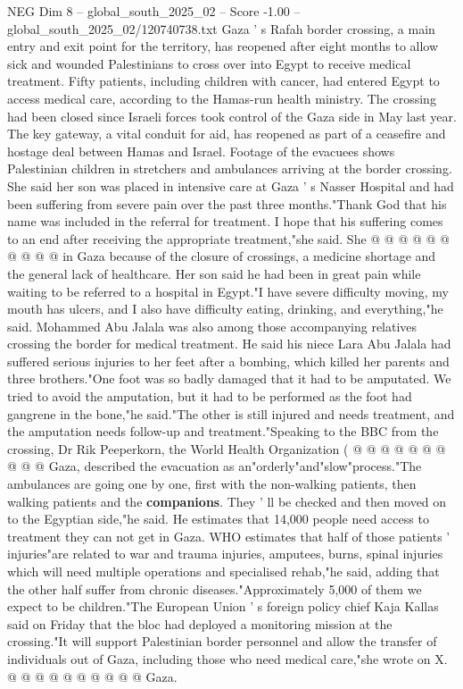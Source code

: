 \begin{textsample}{NEG Dim 8 – global\_south\_2025\_02 – Score -1.00 – global\_south\_2025\_02/120740738.txt}  \label{ex:f8_neg_063}
Gaza ' s Rafah border crossing, a main entry and exit point for the territory, has reopened after eight months to allow sick and wounded Palestinians to cross over into Egypt to receive medical treatment.
Fifty patients, including children with cancer, had entered Egypt to access medical care, according to the Hamas-run health ministry.
The crossing had been closed since Israeli forces took control of the Gaza side in May last year.
The key gateway, a vital conduit for aid, has reopened as part of a ceasefire and hostage deal between Hamas and Israel.
Footage of the evacuees shows Palestinian children in stretchers and ambulances arriving at the border crossing.
She said her son was placed in intensive care at Gaza ' s Nasser Hospital and had been suffering from severe pain over the past three months."Thank God that his name was included in the referral for treatment.
I hope that his suffering comes to an end after receiving the appropriate treatment,"she said.
She @ @ @ @ @ @ @ @ @ @ in Gaza because of the closure of crossings, a medicine shortage and the general lack of healthcare.
Her son said he had been in great pain while waiting to be referred to a hospital in Egypt."I have severe difficulty moving, my mouth has ulcers, and I also have difficulty eating, drinking, and everything,"he said.
Mohammed Abu Jalala was also among those accompanying relatives crossing the border for medical treatment.
He said his niece Lara Abu Jalala had suffered serious injuries to her feet after a bombing, which killed her parents and three brothers."One foot was so badly damaged that it had to be amputated.
We tried to avoid the amputation, but it had to be performed as the foot had gangrene in the bone,"he said."The other is still injured and needs treatment, and the amputation needs follow-up and treatment."Speaking to the BBC from the crossing, Dr Rik Peeperkorn, the World Health Organization ( @ @ @ @ @ @ @ @ @ @ Gaza, described the evacuation as an"orderly"and"slow"process."The ambulances are going one by one, first with the non-walking patients, then walking patients and the \textbf{companions}.
They ' ll be checked and then moved on to the Egyptian side,"he said.
He estimates that 14,000 people need access to treatment they can not get in Gaza.
WHO estimates that half of those patients ' injuries"are related to war and trauma injuries, amputees, burns, spinal injuries which will need multiple operations and specialised rehab,"he said, adding that the other half suffer from chronic diseases."Approximately 5,000 of them we expect to be children."The European Union ' s foreign policy chief Kaja Kallas said on Friday that the bloc had deployed a monitoring mission at the crossing."It will support Palestinian border personnel and allow the transfer of individuals out of Gaza, including those who need medical care,"she wrote on X. @ @ @ @ @ @ @ @ @ @ Gaza.

\end{textsample}
